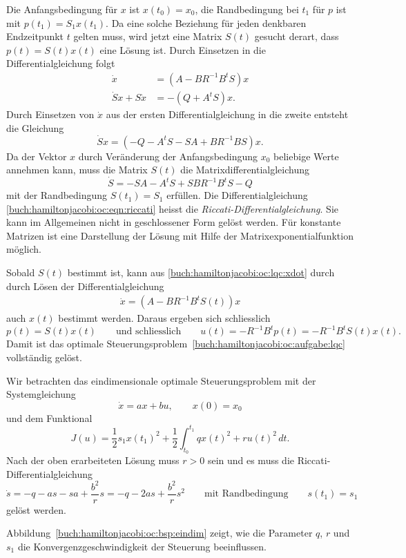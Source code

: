 Die Anfangsbedingung für $x$ ist $x(t_0)=x_0$, die Randbedingung bei
$t_1$ für $p$ ist mit
$p(t_1)=S_1x(t_1)$.
Da eine solche Beziehung für jeden denkbaren Endzeitpunkt $t$
gelten muss, wird jetzt eine Matrix $S(t)$ gesucht derart,
dass $p(t)=S(t)x(t)$ eine Lösung ist.
Durch Einsetzen in die Differentialgleichung folgt
\begin{align}
\dot{x} &= (A - BR^{-1}B^t S)x
\label{buch:hamiltonjacobi:oc:lqc:xdot}
\\
\dot{S}x+S\dot{x} &= -(Q+A^tS)x.
\label{buch:hamiltonjacobi:oc:lqc:Sdot}
\end{align}
Durch Einsetzen von $\dot{x}$ aus der ersten Differentialgleichung
in die zweite entsteht die Gleichung
\[
\dot{S}x
=
(
-Q-A^tS  - SA+BR^{-1}B S
)
x.
\]
Da der Vektor $x$ durch Veränderung der Anfangsbedingung $x_0$ beliebige
Werte annehmen kann, muss die Matrix $S(t)$ die Matrixdifferentialgleichung
\begin{equation}
\dot{S}
=
-SA -A^tS+SBR^{-1}B^tS-Q
\label{buch:hamiltonjacobi:oc:eqn:riccati}
\end{equation}
mit der Randbedingung $S(t_1)=S_1$ erfüllen.
Die Differentialgleichung
\eqref{buch:hamiltonjacobi:oc:eqn:riccati}
heisst die {\em Riccati-Differentialgleichung}.
%
Sie kann im Allgemeinen nicht in geschlossener Form gelöst werden.
Für konstante Matrizen ist eine Darstellung der Lösung mit Hilfe
der Matrixexponentialfunktion möglich.

Sobald $S(t)$ bestimmt ist, kann aus
\eqref{buch:hamiltonjacobi:oc:lqc:xdot}
durch durch Lösen der Differentialgleichung 
\begin{align*}
\dot{x} = (A-BR^{-1}B^tS(t)) x
\end{align*}
auch $x(t)$ bestimmt werden.
Daraus ergeben sich schliesslich
\[
p(t)
=
S(t)x(t)
\qquad
\text{und schliesslich}
\qquad
u(t)
=
-R^{-1}B^tp(t)=-R^{-1}B^tS(t)x(t).
\]
Damit ist das optimale
Steuerungsproblem~\ref{buch:hamiltonjacobi:oc:aufgabe:lqc}
vollständig gelöst.

\begin{beispiel}
\label{buch:hamiltonjacobi:oc:bsp:eindim}

Wir betrachten das eindimensionale optimale Steuerungsproblem mit
der Systemgleichung
\[
\dot x
=
ax + bu,
\qquad
x(0)=x_0
\]
und dem Funktional
\[
J(u)
=
\frac12 s_1x(t_1)^2
+
\frac12
\int_{t_0}^{t_1}
qx(t)^2 + ru(t)^2
\,dt.
\]
Nach der oben erarbeiteten Lösung muss $r>0$ sein und es muss
die Riccati-Differentialgleichung
\[
\dot{s}
=
-q-as -sa + \frac{b^2}rs
=
-q-2as+\frac{b^2}rs^2
\qquad\text{mit Randbedingung}\qquad
s(t_1)=s_1
\]
gelöst werden.

Abbildung~\ref{buch:hamiltonjacobi:oc:bsp:eindim} zeigt, wie die Parameter
$q$, $r$ und $s_1$ die Konvergenzgeschwindigkeit der Steuerung beeinflussen.
\end{beispiel}

